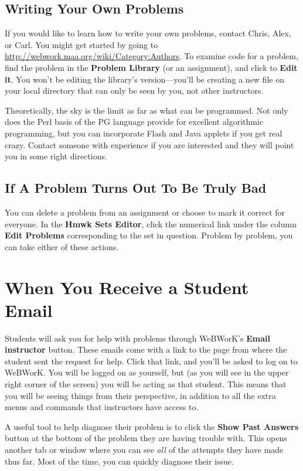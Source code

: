 \documentclass[12pt]{article}
\newcommand{\menu}[1]{\textbf{#1}}
\newcommand{\WW}{WeBWorK}
\newcommand{\HSE}{\menu{Hmwk Sets Editor}}
\begin{document}
\subsection{Writing Your Own Problems}
If you would like to learn how to write your own problems, contact Chris, Alex, or Carl.
You might get started by going to \url{http://webwork.maa.org/wiki/Category:Authors}.
To examine code for a problem, find the problem in the \menu{Problem Library} (or an assignment), and click to \menu{Edit it}.
You won't be editing the library's version---you'll be creating a new file on your local directory that can only be seen by you, not other instructors.

Theoretically, the sky is the limit as far as what can be programmed.
Not only does the Perl basis of the PG language provide for excellent algorithmic programming, but you can incorporate Flash and Java applets if you get real crazy.
Contact someone with experience if you are interested and they will point you in some right directions.

\subsection{If A Problem Turns Out To Be Truly Bad}
You can delete a problem from an assignment or choose to mark it correct for everyone.
In the \HSE, click the numerical link under the column \menu{Edit Problems} corresponding to the set in question.
Problem by problem, you can take either of these actions.

\section{When You Receive a Student Email}
Students will ask you for help with problems through \WW's \menu{Email instructor} button.
These emails come with a link to the page from where the student sent the request for help.
Click that link, and you'll be asked to log on to \WW.
You will be logged on as yourself, but (as you will see in the upper right corner of the screen) you will be acting as that student.
This means that you will be seeing things from their perspective, in addition to all the extra menus and commands that instructors have access to.

A useful tool to help diagnose their problem is to click the \menu{Show Past Answers} button at the bottom of the problem they are having trouble with.
This opens another tab or window where you can see \emph{all} of the attempts they have made thus far.
Most of the time, you can quickly diagnose their issue.
\end{document}

